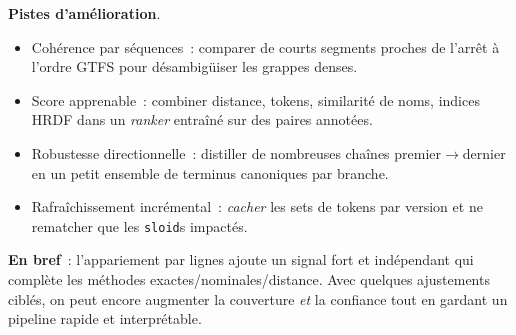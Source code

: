 \textbf{Pistes d'amélioration}.
\begin{itemize}
  \item Cohérence par séquences : comparer de courts segments proches de l'arrêt à l'ordre GTFS pour désambigüiser les grappes denses.
  \item Score apprenable : combiner distance, tokens, similarité de noms, indices HRDF dans un \emph{ranker} entraîné sur des paires annotées.
  \item Robustesse directionnelle : distiller de nombreuses chaînes premier$\rightarrow$dernier en un petit ensemble de terminus canoniques par branche.
  \item Rafraîchissement incrémental : \emph{cacher} les sets de tokens par version et ne rematcher que les \texttt{sloid}s impactés.
\end{itemize}

\noindent \textbf{En bref} : l'appariement par lignes ajoute un signal fort et indépendant qui complète les méthodes exactes/nominales/distance. Avec quelques ajustements ciblés, on peut encore augmenter la couverture \emph{et} la confiance tout en gardant un pipeline rapide et interprétable.
